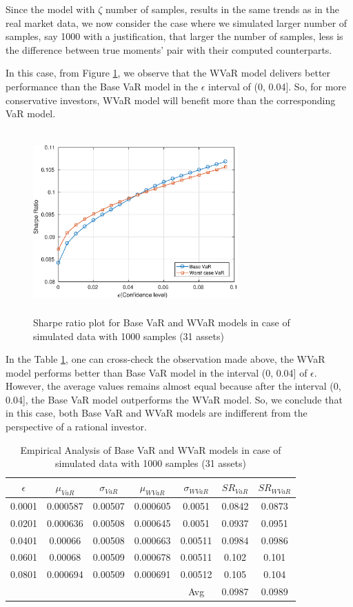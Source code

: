 Since the model with $\zeta$ number of samples, results in the same trends as in the real market data, we now consider the case where we simulated larger number of samples, say 1000 with a justification, that larger the number of samples, less is the difference between true moments' pair with their computed counterparts.

In this case, from Figure \ref{fig:5.3}, we observe that the WVaR model delivers better performance than the Base VaR model in the $\epsilon$ interval of (0, 0.04]. So, for more conservative investors, WVaR model will benefit more than the corresponding VaR model.
\begin{figure}[!h]
\centering
\includegraphics[height=7.0cm,width=0.7\textwidth]{VaR/bse30_simulated/sr_1000_cheb.eps}
\caption{Sharpe ratio plot for Base VaR and WVaR models in case of simulated data with 1000 samples (31 assets)}
\label{fig:5.3}
\end{figure}
In the Table \ref{tab:5.3}, one can cross-check the observation made above, the WVaR model performs better than Base VaR model in the interval (0, 0.04] of $\epsilon$. However, the average values remains almost equal because after the interval (0, 0.04], the Base VaR model outperforms the WVaR model. So, we conclude that in this case, both Base VaR and WVaR models are indifferent from the perspective of a rational investor.
\begin{table}[!h]
\centering
\captionsetup{justification=centering}
\begin{tabular}{||c|c|c|c|c|c|c||}
\hline
$\epsilon$ & $\mu_{VaR}$ & $\sigma_{VaR}$ & $\mu_{WVaR}$ & $\sigma_{WVaR}$ & $SR_{VaR}$ & $SR_{WVaR}$\\
\hline
0.0001 & 0.000587 & 0.00507 & 0.000605 & 0.0051 & 0.0842 & 0.0873 \\
0.0201 & 0.000636 & 0.00508 & 0.000645 & 0.0051 & 0.0937 & 0.0951 \\
0.0401 & 0.00066 & 0.00508 & 0.000663 & 0.00511 & 0.0984 & 0.0986 \\
0.0601 & 0.00068 & 0.00509 & 0.000678 & 0.00511 & 0.102 & 0.101 \\
0.0801 & 0.000694 & 0.00509 & 0.000691 & 0.00512 & 0.105 & 0.104 \\
\hline
& & & & Avg & 0.0987 & 0.0989 \\
\hline
\end{tabular}
\caption{Empirical Analysis of Base VaR and WVaR models in case of simulated data with 1000 samples (31 assets)}
\label{tab:5.3}
\end{table}

